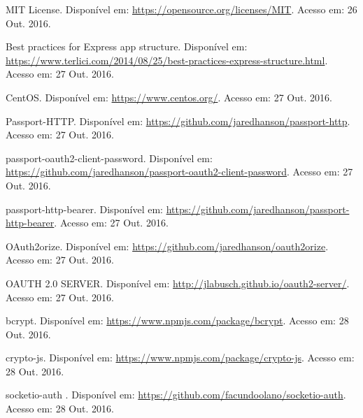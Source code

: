 \documentclass[brazil,ruledheader]{abntifes}
\begin{document}
\begin{thebibliography}{9}
		MIT License. Disponível em: \url{https://opensource.org/licenses/MIT}.
		Acesso em: 26 Out. 2016.
		
		Best practices for Express app structure. Disponível em: \url{https://www.terlici.com/2014/08/25/best-practices-express-structure.html}.
		Acesso em: 27 Out. 2016.
		
		CentOS. Disponível em: \url{https://www.centos.org/}.
		Acesso em: 27 Out. 2016.
		
		Passport-HTTP. Disponível em: \url{https://github.com/jaredhanson/passport-http}.
		Acesso em: 27 Out. 2016.
		
		passport-oauth2-client-password. Disponível em: \url{https://github.com/jaredhanson/passport-oauth2-client-password}.
		Acesso em: 27 Out. 2016.
		
		passport-http-bearer. Disponível em: \url{https://github.com/jaredhanson/passport-http-bearer}.
		Acesso em: 27 Out. 2016.
		
		OAuth2orize. Disponível em: \url{https://github.com/jaredhanson/oauth2orize}.
		Acesso em: 27 Out. 2016.
		
		OAUTH 2.0 SERVER. Disponível em: \url{http://jlabusch.github.io/oauth2-server/}.
		Acesso em: 27 Out. 2016.
		
		bcrypt. Disponível em: \url{https://www.npmjs.com/package/bcrypt}.
		Acesso em: 28 Out. 2016.
		
		crypto-js. Disponível em: \url{https://www.npmjs.com/package/crypto-js}.
		Acesso em: 28 Out. 2016.
		
		socketio-auth . Disponível em: \url{https://github.com/facundoolano/socketio-auth}.
		Acesso em: 28 Out. 2016.
	\end{thebibliography}
		\anexo
	
\end{document}
